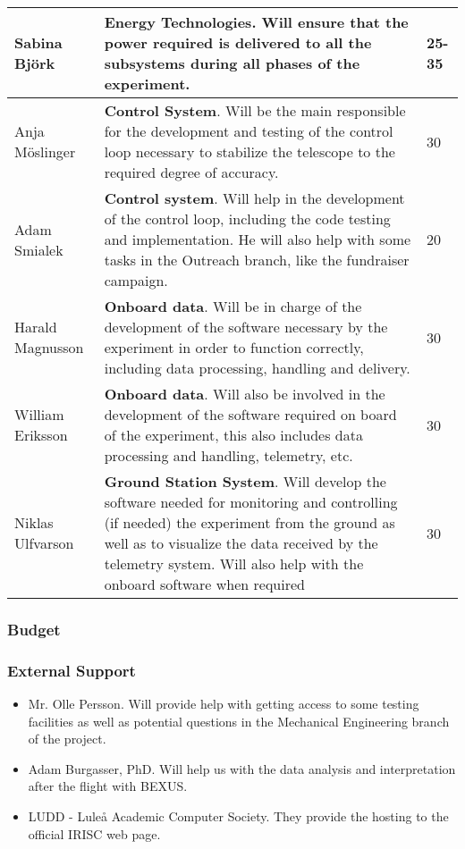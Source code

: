 \begin{longtable}{m{} | m{} | m{}}
	Sabina Bj{\"o}rk & \textbf{Energy Technologies}. Will ensure that the power required is delivered to all the subsystems during all phases of the experiment. & 25-35 \\ \hline
	Anja M{\"o}slinger & \textbf{Control System}. Will be the main responsible for the development and testing of the control loop necessary to stabilize the telescope to the required degree of accuracy. & 30 \\ \hline
	Adam Smialek & \textbf{Control system}.  Will help in the development of the control loop, including the code testing and implementation. He will also help with some tasks in the Outreach branch, like the fundraiser campaign. & 20 \\ \hline
	Harald Magnusson & \textbf{Onboard data}. Will be in charge of the development of the software necessary by the experiment in order to function correctly, including data processing, handling and delivery. & 30 \\ \hline
	William Eriksson & \textbf{Onboard data}. Will also be involved in the development of the software required on board of the experiment, this also includes data processing and handling, telemetry, etc. & 30 \\ \hline
	Niklas Ulfvarson & \textbf{Ground Station System}. Will develop the software needed for monitoring and controlling (if needed) the experiment from the ground as well as to visualize the data received by the telemetry system. Will also help with the onboard software when required & 30 \\ \hline 
	
	
\end{longtable}

\subsubsection{Budget}
\label{sec:3.2.2}




\subsubsection{External Support}

\begin{itemize}
	\item Mr. Olle Persson. Will provide help with getting access to some testing facilities as well as potential questions in the Mechanical Engineering branch of the project.
	\item Adam Burgasser, PhD. Will help us with the data analysis and interpretation after the flight with BEXUS.
	\item LUDD - Luleå Academic Computer Society. They provide the hosting to the official IRISC web page.
\end{itemize}
